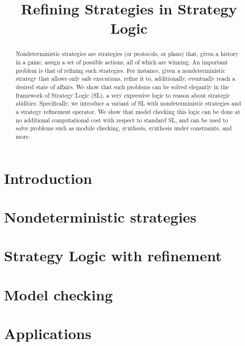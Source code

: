 \documentclass{article}
\title{Refining Strategies in Strategy Logic}
\author{
%
%
%
}
\theoremstyle{definition}
\theoremstyle{plain}
\begin{document}
\maketitle

\begin{abstract}
  Nondeterministic strategies are strategies (or protocols, or plans)
  that, given a history in a game, assign a set of possible actions,
  all of which are winning.  An important problem is that of
  refining such strategies. For instance, given a nondeterministic strategy that allows
only safe executions, 
 refine it to, additionally, eventually reach a desired state of affairs. We show that such problems can
  be solved elegantly in the framework of Strategy Logic (SL), a very
  expressive logic to reason about strategic abilities. Specifically, we
  introduce a variant of SL with nondeterministic strategies 
 and a strategy refinement operator. We 
  show that model checking this logic can be done at 
no additional  computational cost with respect to standard SL, and can
be used to solve problems such as module checking, synthesis,
synthesis under constraints, and more.
\end{abstract}

\section{Introduction}
\label{section:introduction}


\section{Nondeterministic strategies}
\label{section:refinement}



\section{Strategy Logic with refinement}
\label{section:SL}


\section{Model checking \SLref}
\label{section:mc}


\section{Applications}
\label{section:app}




\end{document}
